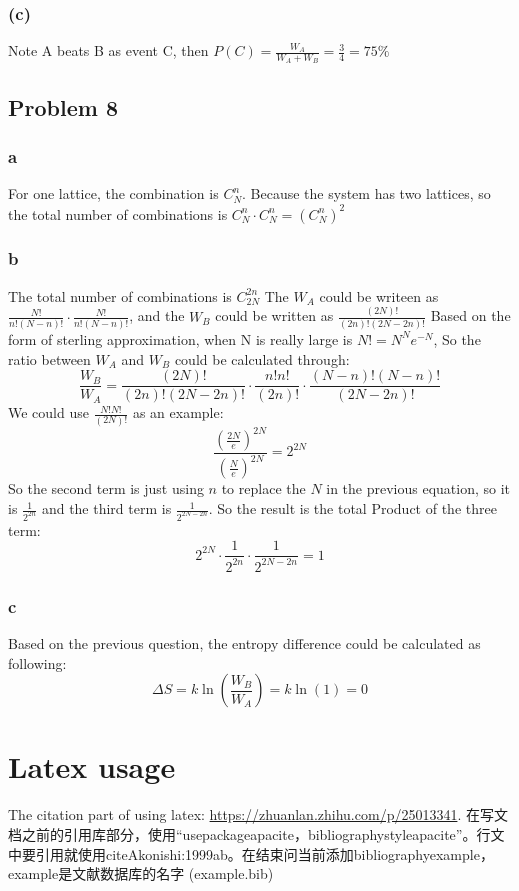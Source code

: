 \documentclass[a4paper]{article}
\begin{document}
\subsubsection{(c)}
Note A beats B as event C, then $P(C)=\frac{W_{A}}{W_{A}+W_{B}}=\frac{3}{4}=75 \%$

\subsection{Problem 8}
\subsubsection{a}
For one lattice, the combination is $C_{N}^{n}$. Because the system has two lattices, so the total number of combinations is $C_{N}^{n} \cdot C_{N}^{n} = (C_{N}^{n})^2$
\subsubsection{b}
The total number of combinations is $C_{2N}^{2n}$
The $W_{A}$ could be writeen as $\frac{N!}{n!(N-n)!}\cdot\frac{N!}{n!(N-n)!}$, and the $W_{B}$ could be written as $\frac{(2N)!}{(2n)!(2N-2n)!}$ Based on the form of sterling approximation, when N is really large is $N! = N^{N}e^{-N}$, So the ratio between $W_{A}$ and $W_{B}$ could be calculated through:
\begin{equation}
	\frac{W_{B}}{W_{A}}=\frac{(2N)!}{(2n)!(2N-2n)!}\cdot \frac{n! n!}{(2n)!}\cdot \frac{(N-n)!(N-n)!}{(2N-2n)!}
\end{equation}
We could use $\frac{N!N!}{(2N)!}$ as an example:
\begin{equation}
	\frac{(\frac{2N}{e})^{2N}}{(\frac{N}{e})^{2N}}=2^{2N}
\end{equation}
So the second term is just using $n$ to replace the $N$ in the previous equation, so it is $\frac{1}{2^{2n}}$ and the third term is $\frac{1}{2^{2N-2n}}$. 
\newline
So the result is the total Product of the three term:
\begin{equation}
	2^{2N} \cdot \frac{1}{2^{2n}} \cdot \frac{1}{2^{2N-2n}}=1
\end{equation}
\subsubsection{c}
Based on the previous question, the entropy difference could be calculated as following:
\begin{equation}
	\Delta S=k \ln (\frac{W_{B}}{W_{A}})=k \ln(1) =0
\end{equation}

\section{Latex usage}
The citation part of using latex: \url{https://zhuanlan.zhihu.com/p/25013341}.
在写文档之前的引用库部分，使用“usepackage{apacite}，bibliographystyle{apacite}”。行文中要引用就使用citeA{konishi:1999ab}。在结束问当前添加bibliography{example}，example是文献数据库的名字 (example.bib)



\end{document}
